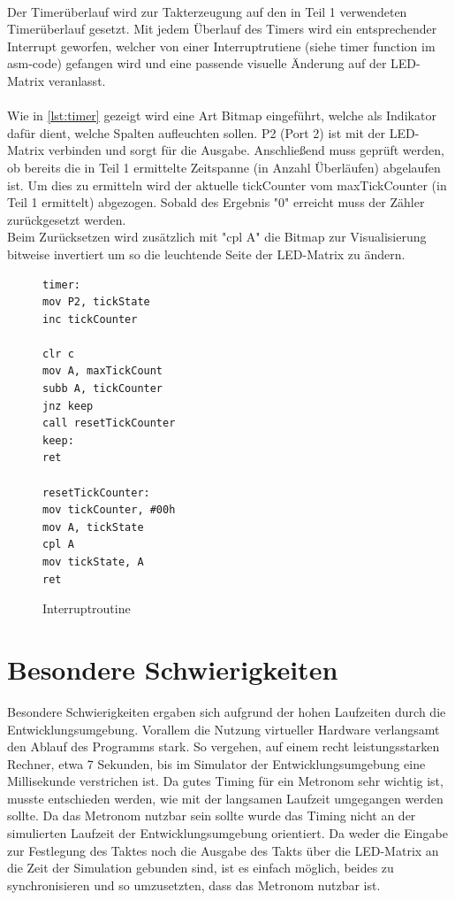 \documentclass[a4paper, 12pt]{scrartcl}
\begin{document}
\begin{onehalfspace}
\\  
Der Timerüberlauf wird zur Takterzeugung auf den in Teil 1 verwendeten Timerüberlauf gesetzt. Mit jedem Überlauf des Timers wird ein entsprechender Interrupt geworfen, welcher von einer Interruptrutiene (siehe timer function im asm-code) gefangen wird und eine passende visuelle Änderung auf der LED-Matrix veranlasst.
\\
\\
Wie in \autoref{lst:timer} gezeigt wird eine Art Bitmap eingeführt, welche als Indikator dafür dient, welche Spalten aufleuchten sollen. P2 (Port 2) ist mit der LED-Matrix verbinden und sorgt für die Ausgabe. Anschließend muss geprüft werden, ob bereits die in Teil 1 ermittelte Zeitspanne (in Anzahl Überläufen) abgelaufen ist. Um dies zu ermitteln wird der aktuelle tickCounter vom maxTickCounter (in Teil 1 ermittelt) abgezogen. Sobald des Ergebnis "0" erreicht muss der Zähler zurückgesetzt werden.
\\
Beim Zurücksetzen wird zusätzlich mit "cpl A" die Bitmap zur Visualisierung bitweise invertiert um so die leuchtende Seite der LED-Matrix zu ändern.

\begin{figure}
\begin{lstlisting}
timer:
mov P2, tickState	
inc tickCounter		

clr c
mov A, maxTickCount
subb A, tickCounter	
jnz keep
call resetTickCounter	
keep:
ret

resetTickCounter:
mov tickCounter, #00h	
mov A, tickState	
cpl A
mov tickState, A
ret
\end{lstlisting}
\caption{Interruptroutine}
\label{lst:timer}
\end{figure}

\newpage
\section{Besondere Schwierigkeiten}
\label{schwierigkeiten}
Besondere Schwierigkeiten ergaben sich aufgrund der hohen Laufzeiten durch die Entwicklungsumgebung. Vorallem die Nutzung virtueller Hardware verlangsamt den Ablauf des Programms stark. So vergehen, auf einem recht leistungsstarken Rechner, etwa 7 Sekunden, bis im Simulator der Entwicklungsumgebung eine Millisekunde verstrichen ist. Da gutes Timing für ein Metronom sehr wichtig ist, musste entschieden werden, wie mit der langsamen Laufzeit umgegangen werden sollte. Da das Metronom nutzbar sein sollte wurde das Timing nicht an der simulierten Laufzeit der Entwicklungsumgebung orientiert. Da weder die Eingabe zur Festlegung des Taktes noch die Ausgabe des Takts über die LED-Matrix an die Zeit der Simulation gebunden sind, ist es einfach möglich, beides zu synchronisieren und so umzusetzten, dass das Metronom nutzbar ist.


\end{onehalfspace}
\end{document}
